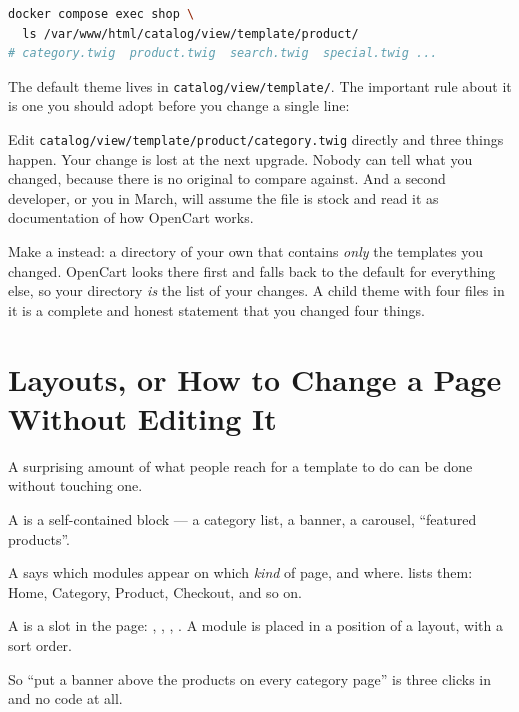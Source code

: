 \begin{lstlisting}[language=bash]
docker compose exec shop \
  ls /var/www/html/catalog/view/template/product/
# category.twig  product.twig  search.twig  special.twig ...
\end{lstlisting}

The default theme lives in
\texttt{catalog/view/template/}. The important rule about it is one you should
adopt before you change a single line:

\begin{alertbox}
Edit \texttt{catalog/view/template/product/category.twig} directly and three
things happen. Your change is lost at the next upgrade. Nobody can tell what
you changed, because there is no original to compare against. And a second
developer, or you in March, will assume the file is stock and read it as
documentation of how OpenCart works.

\smallskip
Make a  instead: a directory of your own that contains
\emph{only} the templates you changed. OpenCart looks there first and falls
back to the default for everything else, so your directory \emph{is} the list
of your changes. A child theme with four files in it is a complete and honest
statement that you changed four things.
\end{alertbox}

\section{Layouts, or How to Change a Page Without Editing It}

A surprising amount of what people reach for a template to do can be done
without touching one.

\begin{definitionbox}
A  is a self-contained block --- a category list, a banner, a
carousel, ``featured products''.

\smallskip
A  says which modules appear on which \emph{kind} of page, and
where. \adminpath{Design, Layouts} lists them: Home, Category, Product,
Checkout, and so on.

\smallskip
A  is a slot in the page: ,
, , . A module is
placed in a position of a layout, with a sort order.

\smallskip
So ``put a banner above the products on every category page'' is three clicks
in \adminpath{Design, Layouts, Category} and no code at all.
\end{definitionbox}


